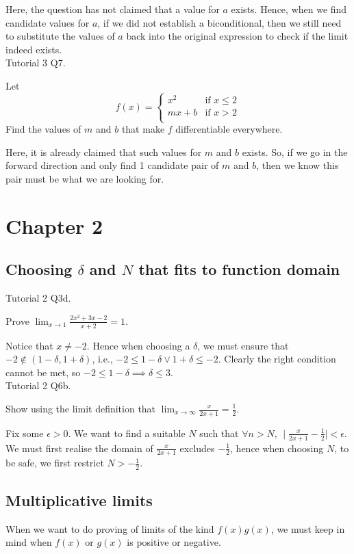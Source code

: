 \documentclass{article}
\begin{document}
Here, the question has not claimed that a value for $a$ exists. Hence, when we find candidate values for $a$, if we did not establish a biconditional, then we still need to substitute the values of $a$ back into the original expression to check if the limit indeed exists.
\\

Tutorial 3 Q7.

Let 
$$f(x)=
\begin{cases}
x^2  &\text{if }x\leq 2\\
mx+b &\text{if }x>2\\
\end{cases}
$$
Find the values of $m$ and $b$ that make $f$ differentiable everywhere.

Here, it is already claimed that such values for $m$ and $b$ exists. So, if we go in the forward direction and only find 1 candidate pair of $m$ and $b$, then we know this pair must be what we are looking for.\\

\section{Chapter 2}
\subsection{Choosing $\delta$ and $N$ that fits to function domain}
Tutorial 2 Q3d.

Prove $\lim_{x\rightarrow 1}\frac{2x^2+3x-2}{x+2}=1$.

Notice that $x\neq -2$. Hence when choosing a $\delta$, we must ensure that $-2\notin (1-\delta, 1+\delta)$, i.e., $-2\leq 1-\delta \lor 1+\delta \leq -2$. Clearly the right condition cannot be met, so $-2\leq 1-\delta \implies \delta \leq 3$.
\\

Tutorial 2 Q6b.

Show using the limit definition that $\lim_{x\rightarrow  \infty}\frac{x}{2x+1}=\frac{1}{2}$.

Fix some $\epsilon>0$. We want to find a suitable $N$ such that $\forall n>N,\, \mid \frac{x}{2x+1}-\frac{1}{2}\mid<\epsilon$.\\
We must first realise the domain of $\frac{x}{2x+1}$ excludes $-\frac{1}{2}$, hence when choosing $N$, to be safe, we first restrict $N>-\frac{1}{2}$.

\subsection{Multiplicative limits}
When we want to do proving of limits of the kind $f(x)g(x)$, we must keep in mind when $f(x)$ or $g(x)$ is positive or negative.
\end{document}
